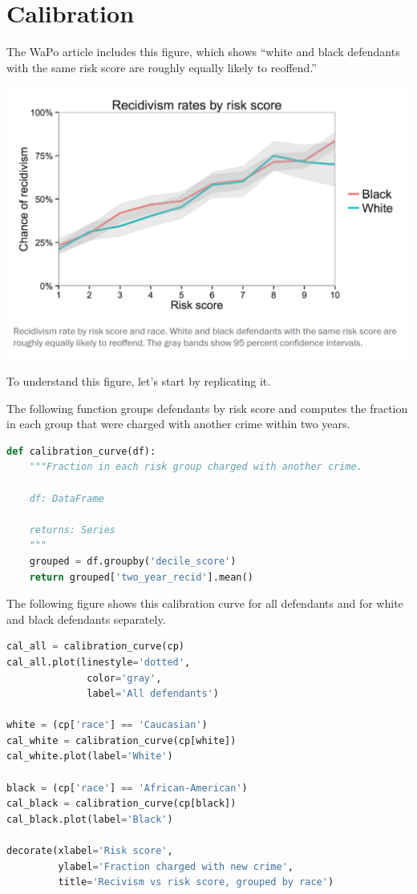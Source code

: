 \hypertarget{calibration-1}{%
\section{Calibration}\label{calibration-1}}

The WaPo article includes this figure, which shows ``white and black
defendants with the same risk score are roughly equally likely to
reoffend.''

\includegraphics{figs/calibration1.png}

To understand this figure, let's start by replicating it.

The following function groups defendants by risk score and computes the
fraction in each group that were charged with another crime within two
years.

\begin{lstlisting}[language=Python,style=source]
def calibration_curve(df):
    """Fraction in each risk group charged with another crime.
    
    df: DataFrame
    
    returns: Series
    """
    grouped = df.groupby('decile_score')
    return grouped['two_year_recid'].mean()
\end{lstlisting}

The following figure shows this calibration curve for all defendants and
for white and black defendants separately.

\begin{lstlisting}[language=Python,style=source]
cal_all = calibration_curve(cp)
cal_all.plot(linestyle='dotted', 
              color='gray',
              label='All defendants')

white = (cp['race'] == 'Caucasian')
cal_white = calibration_curve(cp[white])
cal_white.plot(label='White')

black = (cp['race'] == 'African-American')
cal_black = calibration_curve(cp[black])
cal_black.plot(label='Black')

decorate(xlabel='Risk score',
         ylabel='Fraction charged with new crime',
         title='Recivism vs risk score, grouped by race')
\end{lstlisting}

